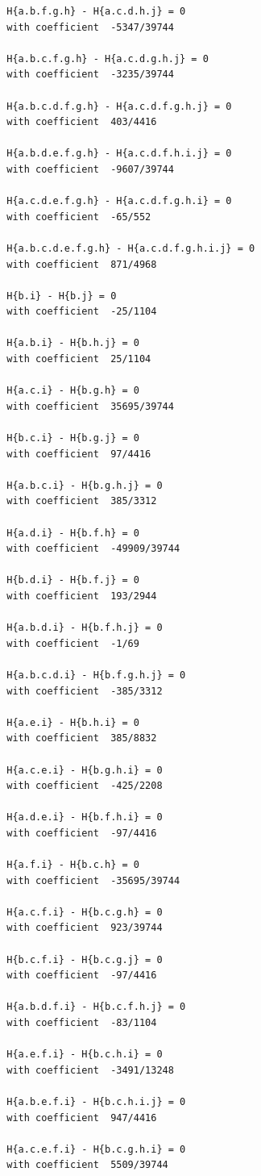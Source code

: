 \documentclass[11pt, a4paper]{kybernetika}
\begin{document}
\begin{verbatim}
		H{a.b.f.g.h} - H{a.c.d.h.j} = 0
		with coefficient  -5347/39744
		
		H{a.b.c.f.g.h} - H{a.c.d.g.h.j} = 0
		with coefficient  -3235/39744
		
		H{a.b.c.d.f.g.h} - H{a.c.d.f.g.h.j} = 0
		with coefficient  403/4416
		
		H{a.b.d.e.f.g.h} - H{a.c.d.f.h.i.j} = 0
		with coefficient  -9607/39744
		
		H{a.c.d.e.f.g.h} - H{a.c.d.f.g.h.i} = 0
		with coefficient  -65/552
		
		H{a.b.c.d.e.f.g.h} - H{a.c.d.f.g.h.i.j} = 0
		with coefficient  871/4968
		
		H{b.i} - H{b.j} = 0
		with coefficient  -25/1104
		
		H{a.b.i} - H{b.h.j} = 0
		with coefficient  25/1104
		
		H{a.c.i} - H{b.g.h} = 0
		with coefficient  35695/39744
		
		H{b.c.i} - H{b.g.j} = 0
		with coefficient  97/4416
		
		H{a.b.c.i} - H{b.g.h.j} = 0
		with coefficient  385/3312
		
		H{a.d.i} - H{b.f.h} = 0
		with coefficient  -49909/39744
		
		H{b.d.i} - H{b.f.j} = 0
		with coefficient  193/2944
		
		H{a.b.d.i} - H{b.f.h.j} = 0
		with coefficient  -1/69
		
		H{a.b.c.d.i} - H{b.f.g.h.j} = 0
		with coefficient  -385/3312
		
		H{a.e.i} - H{b.h.i} = 0
		with coefficient  385/8832
		
		H{a.c.e.i} - H{b.g.h.i} = 0
		with coefficient  -425/2208
		
		H{a.d.e.i} - H{b.f.h.i} = 0
		with coefficient  -97/4416
		
		H{a.f.i} - H{b.c.h} = 0
		with coefficient  -35695/39744
		
		H{a.c.f.i} - H{b.c.g.h} = 0
		with coefficient  923/39744
		
		H{b.c.f.i} - H{b.c.g.j} = 0
		with coefficient  -97/4416
		
		H{a.b.d.f.i} - H{b.c.f.h.j} = 0
		with coefficient  -83/1104
		
		H{a.e.f.i} - H{b.c.h.i} = 0
		with coefficient  -3491/13248
		
		H{a.b.e.f.i} - H{b.c.h.i.j} = 0
		with coefficient  947/4416
		
		H{a.c.e.f.i} - H{b.c.g.h.i} = 0
		with coefficient  5509/39744
		

\end{verbatim}
\end{document}
